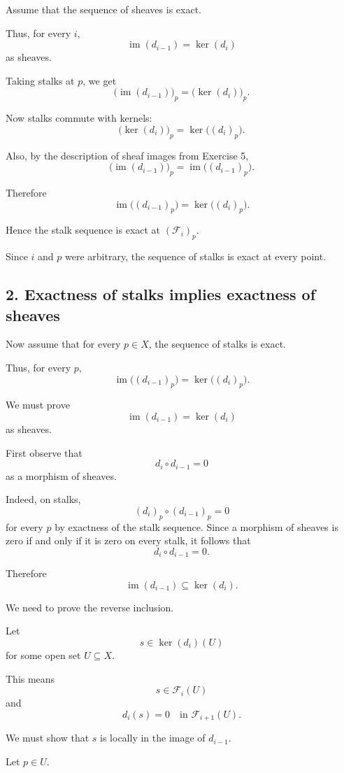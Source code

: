 \documentclass[12pt,a4paper]{article}
\begin{document}
Assume that the sequence of sheaves is exact.

Thus, for every $i$,
\[
\operatorname{im}(d_{i-1})
=
\ker(d_i)
\]
as sheaves.

Taking stalks at $p$, we get
\[
\bigl(\operatorname{im}(d_{i-1})\bigr)_p
=
\bigl(\ker(d_i)\bigr)_p.
\]

Now stalks commute with kernels:
\[
\bigl(\ker(d_i)\bigr)_p
=
\ker\bigl((d_i)_p\bigr).
\]

Also, by the description of sheaf images from Exercise 5,
\[
\bigl(\operatorname{im}(d_{i-1})\bigr)_p
=
\operatorname{im}\bigl((d_{i-1})_p\bigr).
\]

Therefore
\[
\operatorname{im}\bigl((d_{i-1})_p\bigr)
=
\ker\bigl((d_i)_p\bigr).
\]

Hence the stalk sequence is exact at $(\mathcal F_i)_p$.

Since $i$ and $p$ were arbitrary, the sequence of stalks is exact at every
point.

\subsection*{2. Exactness of stalks implies exactness of sheaves}

Now assume that for every $p \in X$, the sequence of stalks is exact.

Thus, for every $p$,
\[
\operatorname{im}\bigl((d_{i-1})_p\bigr)
=
\ker\bigl((d_i)_p\bigr).
\]

We must prove
\[
\operatorname{im}(d_{i-1})
=
\ker(d_i)
\]
as sheaves.

First observe that
\[
d_i \circ d_{i-1} = 0
\]
as a morphism of sheaves.

Indeed, on stalks,
\[
(d_i)_p \circ (d_{i-1})_p = 0
\]
for every $p$ by exactness of the stalk sequence. Since a morphism of sheaves
is zero if and only if it is zero on every stalk, it follows that
\[
d_i \circ d_{i-1} = 0.
\]

Therefore
\[
\operatorname{im}(d_{i-1})
\subseteq
\ker(d_i).
\]

We need to prove the reverse inclusion.

Let
\[
s \in \ker(d_i)(U)
\]
for some open set $U \subseteq X$.

This means
\[
s \in \mathcal F_i(U)
\]
and
\[
d_i(s)=0
\quad \text{in } \mathcal F_{i+1}(U).
\]

We must show that $s$ is locally in the image of $d_{i-1}$.

Let $p \in U$.
\end{document}
